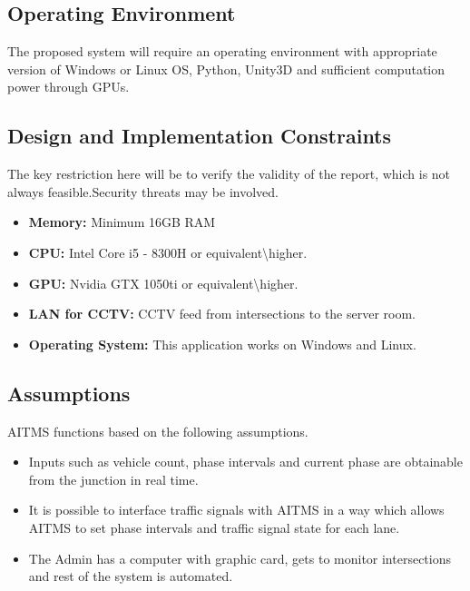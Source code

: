 \documentclass[openany,12pt]{report}
\begin{document}
	\subsection{Operating Environment}
	\hspace*{0.5in}The proposed system will require an operating environment with appropriate version of Windows or Linux OS, Python, Unity3D and sufficient computation power through GPUs.
	
	\subsection{Design and Implementation Constraints}
	\hspace*{0.5in}The key restriction here will be to verify the validity of the report, which is not always feasible.Security threats may be involved.\\
	\begin{itemize}
		\item{\textbf{Memory:} Minimum 16GB RAM}
		\item{\textbf{CPU:} Intel Core i5 - 8300H or equivalent\textbackslash higher.}
		\item{\textbf{GPU:} Nvidia GTX 1050ti or equivalent\textbackslash higher.}
		\item{\textbf{LAN for CCTV:}  CCTV feed from intersections to the server room.}
		\item{\textbf{Operating System:}  This application works on Windows and Linux.}
	\end{itemize}
	
	\subsection{Assumptions}
	\hspace*{0.5in}AITMS functions based on the following assumptions.
	\begin{itemize}
		\item{Inputs such as vehicle count, phase intervals and current phase are obtainable from the junction in real time.}
		\item{It is possible to interface traffic signals with AITMS in a way which allows AITMS to set phase intervals and traffic signal state for each lane.}
		\item{The Admin has a
			computer with graphic card, gets to monitor intersections and rest of the system is automated.}
	\end{itemize}
\end{document}
